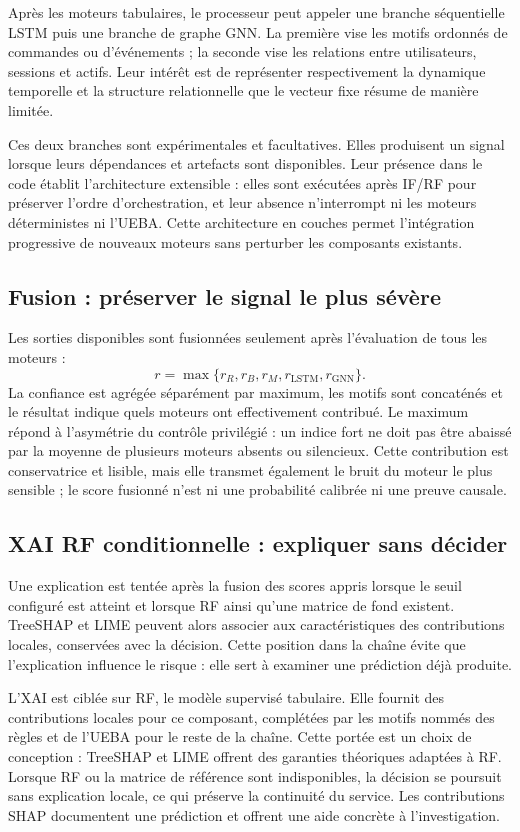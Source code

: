 \documentclass[11pt,a4paper,oneside]{report}
\theoremstyle{definition}
\theoremstyle{plain}
\begin{document}
Après les moteurs tabulaires, le processeur peut appeler une branche
séquentielle LSTM puis une branche de graphe GNN. La première vise les motifs
ordonnés de commandes ou d'événements ; la seconde vise les relations entre
utilisateurs, sessions et actifs. Leur intérêt est de représenter
respectivement la dynamique temporelle et la structure relationnelle que le
vecteur fixe résume de manière limitée.

Ces deux branches sont expérimentales et facultatives. Elles produisent un
signal lorsque leurs dépendances et artefacts sont disponibles. Leur présence
dans le code établit l'architecture extensible : elles sont exécutées après
IF/RF pour préserver l'ordre d'orchestration, et leur absence n'interrompt ni
les moteurs déterministes ni l'UEBA. Cette architecture en couches permet
l'intégration progressive de nouveaux moteurs sans perturber les composants
existants.

\subsection{Fusion : préserver le signal le plus sévère}

Les sorties disponibles sont fusionnées seulement après l'évaluation de tous
les moteurs :
\[
 r=\max\{r_R,r_B,r_M,r_{\mathrm{LSTM}},r_{\mathrm{GNN}}\}.
\]
La confiance est agrégée séparément par maximum, les motifs sont concaténés et
le résultat indique quels moteurs ont effectivement contribué. Le maximum
répond à l'asymétrie du contrôle privilégié : un indice fort ne doit pas être
abaissé par la moyenne de plusieurs moteurs absents ou silencieux. Cette
contribution est conservatrice et lisible, mais elle transmet également le
bruit du moteur le plus sensible ; le score fusionné n'est ni une probabilité
calibrée ni une preuve causale.

\subsection{XAI RF conditionnelle : expliquer sans décider}

Une explication est tentée après la fusion des scores appris lorsque le seuil
configuré est atteint et lorsque RF ainsi qu'une matrice de fond existent.
TreeSHAP et LIME peuvent alors associer aux caractéristiques des contributions
locales, conservées avec la décision. Cette position dans la chaîne évite que
l'explication influence le risque : elle sert à examiner une prédiction déjà
produite.

L'XAI est ciblée sur RF, le modèle supervisé tabulaire. Elle fournit des
contributions locales pour ce composant, complétées par les motifs nommés des
règles et de l'UEBA pour le reste de la chaîne. Cette portée est un choix de
conception : TreeSHAP et LIME offrent des garanties théoriques adaptées à RF.
Lorsque RF ou la matrice de référence sont indisponibles, la décision se
poursuit sans explication locale, ce qui préserve la continuité du service. Les
contributions SHAP documentent une prédiction et offrent une aide concrète à
l'investigation.
\end{document}
